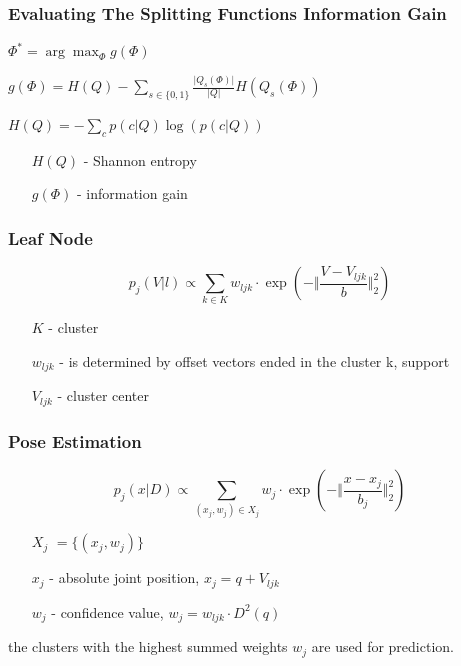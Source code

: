 \documentclass[xcolor=dvipsnames]{beamer}
\begin{document}
\begin{frame}
	\frametitle{Evaluating The Splitting Functions Information Gain}
	\large

	\vspace{1cm}
	$\Phi^* = \arg\max_\Phi g(\Phi)$
	\vspace{1cm}
	
	$g(\Phi) = H(Q) - \sum\limits_{s \in \{0, 1\}}^{} \frac{\vert Q_s(\Phi) \vert}{\vert Q \vert} H(Q_s(\Phi))$
	\vspace{1cm}
	
	$H(Q) = - \sum\limits_{c}^{} p(c | Q) \log( p(c | Q) )$
	
	\vspace{1cm}
	\normalsize
	\begin{itemize}
		\item[$H(Q)$ - ] Shannon entropy
		\item[$g(\Phi)$ - ] information gain
	\end{itemize}
\end{frame}

\begin{frame}
	\frametitle{Leaf Node}
	\large
	
	\begin{equation*}
		p_j(V | l) \propto \sum\limits_{k \in K}^{} w_{ljk} \cdot \exp(- \Vert \frac{V - V_{ljk}}{b} \Vert^2_2)
	\end{equation*}
	\vspace{1cm}
	\begin{itemize}
		\item[$K$ - ] cluster
		\item[$w_{ljk}$ - ] is determined by offset vectors ended in the cluster k,
		support
		\item[$V_{ljk}$ - ] cluster center
	\end{itemize}
\end{frame}

\begin{frame}
	\frametitle{Pose Estimation}

	\begin{equation*}
		p_j(x | D) \propto \sum\limits_{(x_j, w_j) \in X_j}^{} w_{j} \cdot \exp(- \Vert \frac{x - x_j}{b_j} \Vert^2_2)
	\end{equation*}
	
	\vspace{1cm}

	\begin{itemize}
		\item[$X_j$]$= \{(x_j, w_j)\}$
		\item[]
		\item[$x_j$ - ] absolute joint position, $x_j = q + V_{ljk}$
		\item[$w_j$ - ] confidence value, $w_j = w_{ljk} \cdot D^2(q)$
	\end{itemize}
	
	\vspace{0.5cm}
	
	the clusters with the highest summed weights $w_j$ are used for prediction.
\end{frame}
\end{document}
